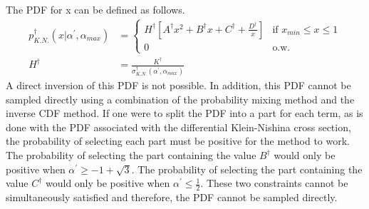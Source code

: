 The PDF for x can be defined as follows.
\begin{align}
  p_{K.N.}^{\dagger}(x|\alpha^{'},\alpha_{max}) & = 
  \begin{cases}
    H^{\dagger}\left[A^{\dagger}x^2 + B^{\dagger}x + C^{\dagger} + \frac{D^{\dagger}}{x}
      \right] & \text{if } x_{min} \leq x \leq 1 \\
    0 & \text{o.w.}
  \end{cases} 
  \label{eq:adjoint_incoherent_pdf_x} \\
  H^{\dagger} & = \frac{K^{\dagger}}{\sigma_{K.N.}^{\dagger}(\alpha^{'},\alpha_{max})}
  \nonumber 
\end{align}
A direct inversion of this PDF is not possible. In addition, this PDF cannot be
sampled directly using a combination of the probability mixing method and the
inverse CDF method. If one were to split the PDF into a part for each term, as
is done with the PDF associated with the differential Klein-Nishina cross
section, the probability of selecting each part must be positive for the method
to work. The probability of selecting the part containing the value $B^{\dagger}$
would only be positive when $\alpha^{'} \geq -1 + \sqrt{3}$. The probability of
selecting the part containing the value $C^{\dagger}$ would only be positive when
$\alpha^{'} \leq \frac{1}{2}$. These two constraints cannot be simultaneously
satisfied and therefore, the PDF cannot be sampled directly.

